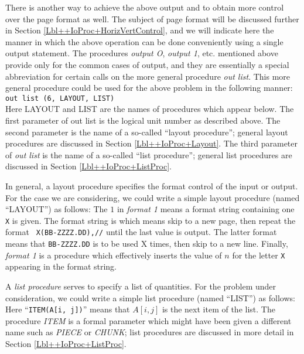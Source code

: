 \documentclass[a4paper,11pt]{article}
\begin{document}
There is another way to achieve the above output and to obtain more
control over the page format as well.  The subject of page format will
be discussed further in Section \ref{Lbl++IoProc+HorizVertControl},
and we will indicate here the manner in which the above operation can
be done conveniently using a single output statement.  The procedures
{\it output O}, {\it output 1}, etc. mentioned above provide only for
the common cases of output, and they are essentially a special
abbreviation for certain calls on the more general procedure {\it out
list}.  This more general procedure could be used for the above
problem in the following manner:\vspace{0.5em}\\ {\tt out list (6,
LAYOUT, LIST)}\vspace{0.5em}\\ Here LAYOUT and LIST are the names of
procedures which appear below.  The first parameter of out list is the
logical unit number as described above. The second parameter is the
name of a so-called ``layout procedure''; general layout procedures
are discussed in Section \ref{Lbl++IoProc+Layout}.  The third
parameter of {\it out list} is the name of a so-called ``list
procedure''; general list procedures are discussed in Section
\ref{Lbl++IoProc+ListProc}.

In general, a layout procedure specifies the format control of the
input or output. For the case we are considering, we could write a
simple layout procedure (named ``LAYOUT'') as follows:
\noindent{}The $1$ in {\it format 1} means a format string containing
one {\tt X} is given. The format string is
\noindent{}which means skip to a new page, then repeat the format {\tt
X(BB-ZZZZ.DD),//} until the last value is output.  The latter format
means that {\tt BB-ZZZZ.DD} is to be used X times, then skip to a new
line. Finally, {\it format 1} is a procedure which effectively inserts
the value of $n$ for the letter {\tt X} appearing in the format
string.

A {\it list procedure} serves to specify a list of quantities.  For the
problem under consideration, we could write a simple list procedure
(named ``LIST'') as follows:
\noindent{}Here ``{\tt ITEM(A[i, j])}'' means that $A[i, j]$ is the
next item of the list. The procedure {\it ITEM} is a formal parameter
which might have been given a different name such as {\it PIECE} or
{\it CHUNK}; list procedures are discussed in more detail in Section
\ref{Lbl++IoProc+ListProc}.
\end{document}
